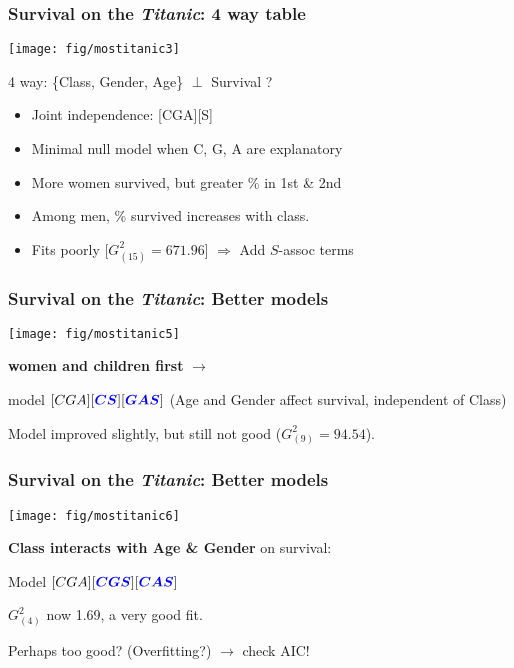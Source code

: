 \begin{frame}
\frametitle{Survival on the \textit{Titanic}: 4 way table}

 \begin{minipage}[c]{.55\dispwidth}
  \texttt{[image: fig/mostitanic3]}
 \end{minipage}%
 \hfill
 \begin{minipage}[c]{.44\dispwidth}
4 way:  \{Class, Gender, Age\} $\perp$ Survival ?

  \begin{itemize}
    \item Joint independence: [CGA][S]
	\item \alert{Minimal null model} when C, G, A are explanatory
	\item More women survived, but greater \% in 1st \& 2nd
	\item Among men,  \% survived increases with class.  
	\item Fits poorly [$G^2_{(15)} = 671.96$] $\Rightarrow$  \alert{Add $S$-assoc} terms
  \end{itemize}
 \end{minipage}
\end{frame}

\begin{frame}
\frametitle{Survival on the \textit{Titanic}: Better models}

 \begin{minipage}[c]{.5\dispwidth}
  \texttt{[image: fig/mostitanic5]}
 \end{minipage}%
 \hfill
 \begin{minipage}[c]{.49\dispwidth}
	\textbf{women and children first} $\longrightarrow$
	\begin{itemize*}
    \item model $[CGA][{\color{blue}\bm{CS}}][{\color{blue}\bm{GAS}}]$ (Age and Gender affect survival, independent
	of Class)
	\item Model improved slightly, but still not good ($G^2_{(9)} = 94.54$).
	\end{itemize*}
 \end{minipage}
\end{frame}

\begin{frame}
\frametitle{Survival on the \textit{Titanic}: Better models}

 \begin{minipage}[c]{.5\dispwidth}
  \texttt{[image: fig/mostitanic6]}
 \end{minipage}%
 \hfill
 \begin{minipage}[c]{.49\dispwidth}
	\textbf{Class interacts with Age \& Gender} on survival: 
	\begin{itemize*}
    \item Model $[CGA][{\color{blue}\bm{CGS}}][{\color{blue}\bm{CAS}}]$
	\item $G^2_{(4)}$ now 1.69, a very good fit.
    \item Perhaps too good? (Overfitting?) $\rightarrow$ check AIC!
	\end{itemize*}

 \end{minipage}
\end{frame}


